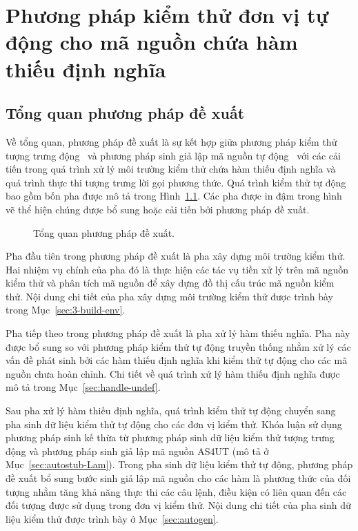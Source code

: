\chapter{Phương pháp kiểm thử đơn vị tự động cho mã nguồn chứa hàm thiếu định nghĩa}\label{chap3}
\section{Tổng quan phương pháp đề xuất}\label{sec:tongquan}
Về tổng quan, phương pháp đề xuất là sự kết hợp giữa phương pháp kiểm thử tượng trưng động~\cite{ConcolicTesting} và phương pháp sinh giả lập mã nguồn tự động~\cite{TUNG2022106821} với các cải tiến trong quá trình xử lý môi trường kiểm thử chứa hàm thiếu định nghĩa và quá trình thực thi tượng trưng lời gọi phương thức. Quá trình kiểm thử tự động bao gồm bốn pha được mô tả trong Hình~\ref{fig:proposed-flow}. Các pha được in đậm trong hình vẽ thể hiện chúng được bổ sung hoặc cải tiến bởi phương pháp đề xuất.

\begin{figure}[h]
    \centering
    
    \caption{Tổng quan phương pháp đề xuất.}
    \label{fig:proposed-flow}
\end{figure}

Pha đầu tiên trong phương pháp đề xuất là pha xây dựng môi trường kiểm thử. Hai nhiệm vụ chính của pha đó là thực hiện các tác vụ tiền xử lý trên mã nguồn kiểm thử và phân tích mã nguồn để xây dựng đồ thị cấu trúc mã nguồn kiểm thử. Nội dung chi tiết của pha xây dựng môi trường kiểm thử được trình bày trong Mục~\ref{sec:3-build-env}.

Pha tiếp theo trong phương pháp đề xuất là pha xử lý hàm thiếu nghĩa. Pha này được bổ sung so với phương pháp kiểm thử tự động truyền thống nhằm xử lý các vấn đề phát sinh bởi các hàm thiếu định nghĩa khi kiểm thử tự động cho các mã nguồn chưa hoàn chỉnh. Chi tiết về quá trình xử lý hàm thiếu định nghĩa được mô tả trong Mục~\ref{sec:handle-undef}.

Sau pha xử lý hàm thiếu định nghĩa, quá trình kiểm thử tự động chuyển sang pha sinh dữ liệu kiểm thử tự động cho các đơn vị kiểm thử. Khóa luận sử dụng phương pháp sinh kế thừa từ phương pháp sinh dữ liệu kiểm thử tượng trưng động và phương pháp sinh giả lập mã nguồn AS4UT (mô tả ở Mục~\ref{sec:autostub-Lam}). Trong pha sinh dữ liệu kiểm thử tự động, phương pháp đề xuất bổ sung bước sinh giả lập mã nguồn cho các hàm là phương thức của đối tượng nhằm tăng khả năng thực thi các câu lệnh, điều kiện có liên quan đến các đối tượng được sử dụng trong đơn vị kiểm thử. Nội dung chi tiết của pha sinh dữ liệu kiểm thử được trình bày ở Mục~\ref{sec:autogen}. 

